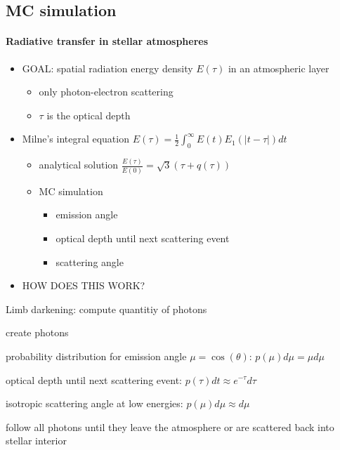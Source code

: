 \documentclass[10pt,a4paper]{article}
\begin{document}
\subsection{MC simulation}
\paragraph{Radiative transfer in stellar atmospheres}
\begin{itemize}
\item GOAL: spatial radiation energy density $E(\tau)$ in an atmospheric layer 
\begin{itemize}
\item only photon-electron scattering
\item $\tau$ is the optical depth
\end{itemize}

\item Milne's integral equation $\boxed{E(\tau) = \frac{1}{2} \int_0^{\infty} E(t) E_1(|t-\tau|) dt}$
\begin{itemize}
\item analytical solution $\frac{E(\tau)}{E(0)} = \sqrt{3} (\tau + q(\tau))$
\item MC simulation
\begin{itemize}
\item emission angle
\item optical depth until next scattering event
\item scattering angle
\end{itemize}
\end{itemize}

\item HOW DOES THIS WORK?
\end{itemize}

\begin{algorithm}
\caption{Limb darkening: compute quantitiy of photons}\label{limb_darkening}
\begin{algorithmic}
\State create photons

\State probability distribution for emission angle $\mu = \cos(\theta)$: $\boxed{p(\mu) d \mu = \mu d \mu}$

\State optical depth until next scattering event: $\boxed{p(\tau)dt \approx e^{-\tau} d\tau}$

\State isotropic scattering angle at low energies: $\boxed{p(\mu) d\mu \approx d\mu}$

\State follow all photons until they leave the atmosphere or are scattered back into stellar interior
\end{algorithmic}
\end{algorithm}
\end{document}
